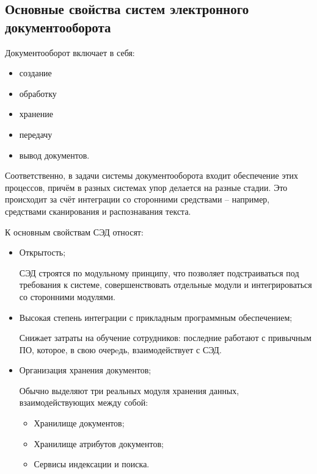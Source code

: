 \subsection{Основные свойства систем электронного документооборота} \label{review_common}

Документооборот включает в себя:
\begin{itemize}
	\item создание
	\item обработку
	\item хранение
	\item передачу
	\item вывод документов.
\end{itemize}

Соответственно, в задачи системы документооборота входит обеспечение этих процессов, причём в разных системах упор делается на разные стадии. Это происходит за счёт интеграции со сторонними средствами – например, средствами сканирования и распознавания текста.

\vspace{\baselineskip}
К основным свойствам СЭД относят:
\begin{itemize}
	\item Открытость;
		
	СЭД строятся по модульному принципу, что позволяет подстраиваться под требования к системе, совершенствовать отдельные модули и интегрироваться со сторонними модулями.
	\item Высокая степень интеграции с прикладным программным обеспечением;

	Снижает затраты на обучение сотрудников: последние работают с привычным ПО, которое, в свою очерeдь, взаимодействует с СЭД.
	\item Организация хранения документов;

	Обычно выделяют три реальных модуля хранения данных, взаимодействующих между собой:
	\begin{itemize}
		\item Хранилище документов;
		\item Хранилище атрибутов документов;
		\item Сервисы индексации и поиска.
	\end{itemize}
\end{itemize}

